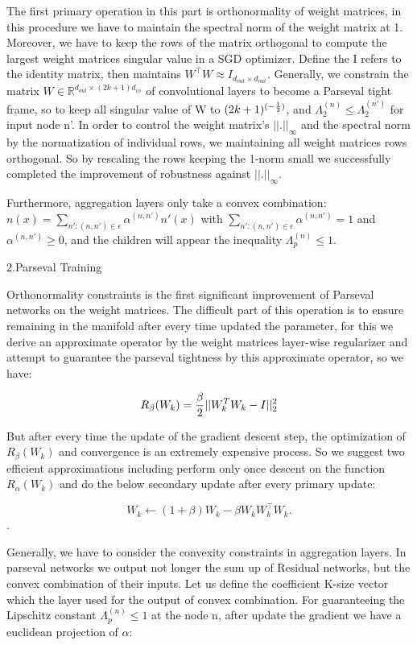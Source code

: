 The first primary operation in this part is orthonormality of weight matrices, in this procedure we have to maintain the spectral norm of the weight matrix at 1. Moreover, we have to keep the rows of the matrix orthogonal to compute the largest weight matrices singular value in a SGD optimizer. Define the I refers to the identity matrix, then maintains $W^\top W \approx I_{d_{out}\times d_{out}}$. Generally, we constrain the matrix $W\in \mathbb{R}^{d_{out} \times (2k+1)d_{in}}$ of convolutional layers to become a Parseval tight frame, so to keep all singular value of W to $(2k+1)^{(-{1 \over 2})}$, and $\Lambda_2^{(n)}\leq \Lambda_2^{(n')}$ for input node n'. In order to control the weight matrix's $||.||_{\infty}$ and the spectral norm by the normatization of individual rows, we maintaining all weight matrices rows orthogonal. So by rescaling the rows keeping the 1-norm small we successfully completed the improvement of robustness against $||.||_{\infty}$. 

Furthermore, aggregation layers only take a convex combination: $n(x) = \sum_{n':(n,n')\in\epsilon} \alpha^{(n,n')}n'(x)$ with $\sum_{n':(n,n')\in \epsilon}\alpha^{(n,n')}=1$ and $\alpha^{(n,n')} \geq 0$, and the children will appear the inequality $\Lambda_p^{(n)}\leq1$.


2.Parseval Training

Orthonormality constraints is the first significant improvement of Parseval networks on the weight matrices. The difficult part of this operation is to ensure remaining in the manifold after every time updated the parameter, for this we derive an approximate operator by the weight matrices layer-wise regularizer and attempt to guarantee the parseval tightness by this approximate operator, so we have:

$$R_{\beta}(W_k) = {{\beta}\over{2}}||W_k^TW_k - I||_2^2$$

But after every time the update of the gradient descent step, the optimization of $R_{\beta}(W_k)$ and convergence is an extremely expensive process. So we suggest two efficient approximations including perform only once descent on the function $R_{\alpha}(W_k)$ and do the below secondary update after every primary update:

$$ W_k\leftarrow (1+\beta)W_k - \beta W_k W_k^{\top} W_k.$$.

Generally, we have to consider the convexity constraints in aggregation layers. In parseval networks we output not longer the sum up of Residual networks, but the convex combination of their inputs. Let us define the coefficient K-size vector which the layer used for the output of convex combination. For guaranteeing the Lipschitz constant $\Lambda_p^{(n)}\leq 1$ at the node n, after update the gradient we have a euclidean projection of $\alpha$: 


